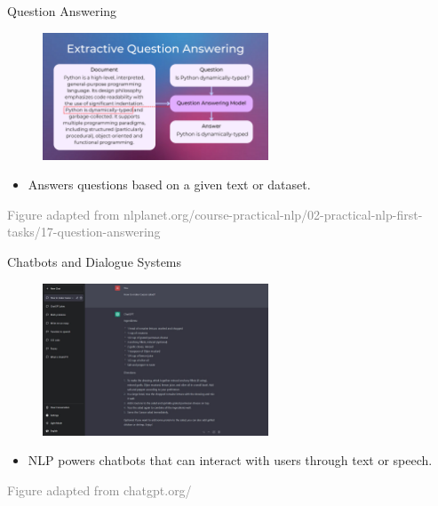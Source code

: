 \documentclass[serif, aspectratio=169]{beamer}
\begin{document}
\begin{frame}{Question Answering}
	\begin{figure}
		\centering
		\includegraphics[width=0.6\textwidth]{pic/question_answering_image.png}
	\end{figure}
	\begin{itemize}
		\item Answers questions based on a given text or dataset.
	\end{itemize}
	\vspace{0.6cm}
	\hspace{-1.0cm}
	{\tiny \textcolor{gray}{Figure adapted from nlplanet.org/course-practical-nlp/02-practical-nlp-first-tasks/17-question-answering}}
\end{frame}

\begin{frame}{Chatbots and Dialogue Systems}
	\begin{figure}
		\centering
		\includegraphics[width=0.6\textwidth]{pic/chatbot_image.jpg}
	\end{figure}
	\begin{itemize}
		\item NLP powers chatbots that can interact with users through text or speech.
	\end{itemize}
	\vspace{0.3cm}
	\hspace{-1.0cm}
	{\tiny \textcolor{gray}{Figure adapted from chatgpt.org/}}
\end{frame}
\end{document}
